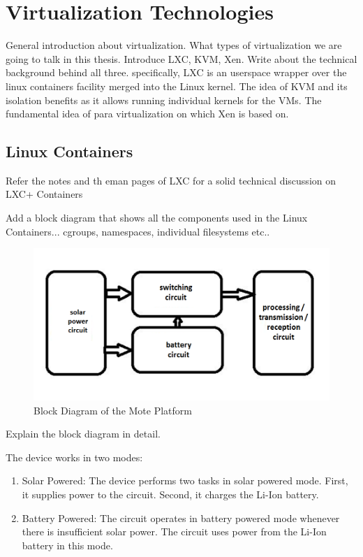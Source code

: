 \chapter{Virtualization Technologies}
General introduction about virtualization. What types of virtualization we are going to talk in this thesis. Introduce LXC, KVM, Xen.
Write about the technical background behind all three.
specifically, LXC is an userspace wrapper over the linux containers facility merged into the Linux kernel.
The idea of KVM and its isolation benefits as it allows running individual kernels for the VMs.
The fundamental idea of para virtualization on which Xen is based on.

\section{Linux Containers}
Refer the notes and th eman pages of LXC for a solid technical discussion on LXC+ Containers

Add a block diagram that shows all the components used in the Linux Containers... cgroups, namespaces, individual filesystems etc..

\begin{figure}[htbp]
\centering
\includegraphics[width=\columnwidth]{block_dia.png}
\caption{Block Diagram of the Mote Platform}
\label{img_blockDia}
\end{figure}


Explain the block diagram in detail.

The device works in two modes:
\begin{enumerate}
\item Solar Powered:
The device performs two tasks in solar powered mode. First, it supplies power to the circuit. Second, it charges the Li-Ion battery.
\item Battery Powered:
The circuit operates in battery powered mode whenever there is insufficient solar power. The circuit uses power from the Li-Ion battery in this mode.
\end{enumerate}

